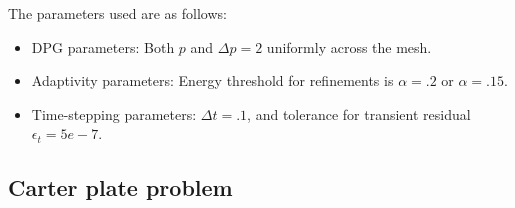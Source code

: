 \documentclass{article}
\begin{document}
The parameters used are as follows:
\begin{itemize}
\item{DPG parameters:} Both $p$ and $\Delta p = 2$ uniformly across the mesh. 
\item{Adaptivity parameters:} Energy threshold for refinements is $\alpha = .2$ or $\alpha = .15$. 
\item{Time-stepping parameters:} $\Delta t = .1$, and tolerance for transient residual $\epsilon_t = 5e-7$.
\end{itemize}



\subsection{Carter plate problem}
\end{document}
